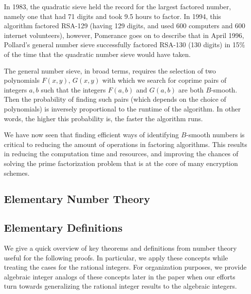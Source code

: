 \documentclass[12pt]{amsart}
\theoremstyle{definition}
\begin{document}
In 1983, the quadratic sieve held the record for the largest factored number, namely one that had 71 digits and took 9.5 hours to factor. In 1994, this algorithm factored RSA-129 (having 129 digits, and used 600 computers and 600 internet volunteers), however, Pomerance goes on to describe that in April 1996, Pollard's general number sieve successfully factored RSA-130 (130 digits) in 15\% of the time that the quadratic number sieve would have taken. 

The general number sieve, in broad terms, requires the selection of two polynomials $F(x,y), \, G(x,y)$ with which we search for coprime pairs of integers $a,b$ such that the integers $F(a,b)$ and $G(a,b)$ are both $B$-smooth. Then the probability of finding such pairs (which depends on the choice of polynomials) is inversely proportional to the runtime of the algorithm. In other words, the higher this probability is, the faster the algorithm runs.

We have now seen that finding efficient ways of identifying $B$-smooth numbers is critical to reducing the amount of operations in factoring algorithms. This results in reducing the computation time and resources, and improving the chances of solving the prime factorization problem that is at the core of many encryption schemes.




\subsection{Elementary Number Theory}


\subsection{Elementary Definitions}

We give a quick overview of key theorems and definitions from number theory useful for the following proofs. In particular, we apply these concepts while treating the cases for the rational integers. For organization purposes, we provide algebraic integer analogs of these concepts later in the paper when our efforts turn towards generalizing the rational integer results to the algebraic integers.
\end{document}
